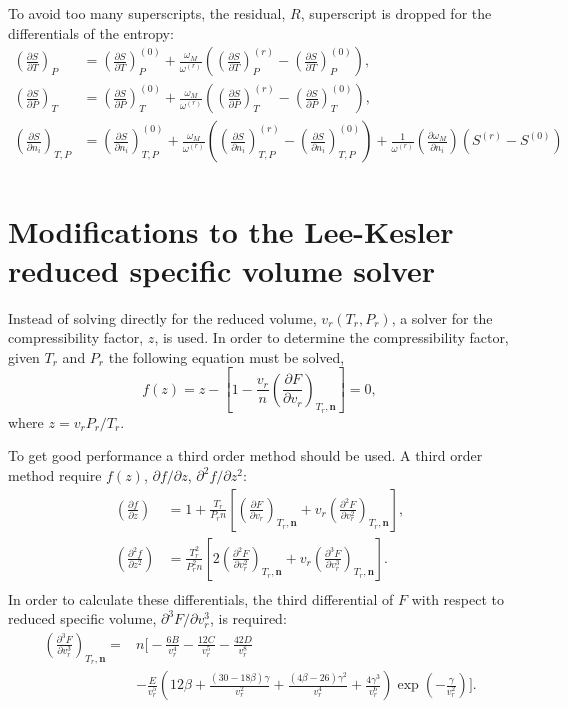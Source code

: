 \documentclass[internal,english]{sintefmemo2012}
\numberwithin{equation}{section}
\newcommand*{\pder}[2]{\left(\frac{\partial #1}{\partial #2}\right)}
\newcommand*{\pdder}[2]{\left(\frac{\partial^2 #1}{\partial
      #2^2}\right)}
\newcommand*{\pddder}[2]{\left(\frac{\partial^3 #1}{\partial #2^3}\right)}
\begin{document}
To avoid too many superscripts, the residual, $R$, superscript is
dropped for the differentials of the entropy:
\begin{align}
\label{eq:LK_entropy_diff}
\pder{S}{T}_{P} &= \pder{S}{T}_{P}^{(0)} +
\frac{\omega_M}{\omega^{(r)}}\left(\pder{S}{T}_{P}^{(r)} -
\pder{S}{T}_{P}^{(0)}\right), \\
\pder{S}{P}_{T} &= \pder{S}{P}_{T}^{(0)} +
\frac{\omega_M}{\omega^{(r)}}\left(\pder{S}{P}_{T}^{(r)} -
\pder{S}{P}_{T}^{(0)}\right), \\
\pder{S}{n_i}_{T,P} &= \pder{S}{n_i}_{T,P}^{(0)} +
\frac{\omega_M}{\omega^{(r)}}\left(\pder{S}{n_i}_{T,P}^{(r)} -
\pder{S}{n_i}_{T,P}^{(0)}\right) +
\frac{1}{\omega^{(r)}}\pder{\omega_M}{n_i}\left(S^{(r)} - S^{(0)}\right)\\
\end{align}

\section{Modifications to the Lee-Kesler reduced specific volume solver}
Instead of solving directly for the reduced volume, $v_r(T_r,P_r)$, a solver
for the compressibility factor, $z$, is used. In order to determine the
compressibility factor, given $T_r$ and $P_r$ the following equation
must be solved,
\begin{equation}
\label{eq:LK_z_fun}
f(z) = z - \left[1 - \frac{v_r}{n} \left( \frac{\partial F}{\partial v_r} \right)_{T_r, \textbf{n}} \right] = 0,
\end{equation}
where $z=v_rP_r/T_r$.

To get good performance a third order method should be used. A third
order method require $f(z)$, $\partial f/ \partial z$, $\partial^2
f / \partial z^2$:
\begin{align}
\label{eq:LK_z_fun_diff}
\pder{f}{z} &= 1 + \frac{T_r}{P_r n} \left[\pder{F}{v_r}_{T_r, \textbf{n}} + v_r\pdder{F}{v_r}_{T_r, \textbf{n}}\right],\\
\pdder{f}{z} &= \frac{T_r^2}{P_r^2 n} \left[2\pdder{F}{v_r}_{T_r,
    \textbf{n}} + v_r \pddder{F}{v_r}_{T_r, \textbf{n}}\right].\\
\end{align}
In order to calculate these differentials, the third differential of
$F$ with respect to reduced specific volume, $\partial^3
F/ \partial v_r^3$, is required:
\begin{align}
\label{eq:LK_FDiff3vr}
\pddder{F}{v_r}_{T_r, \textbf{n}} =& n \bigg[-\frac{6B}{v_r^4} - \frac{12C}{v_r^5} - \frac{42D}{v_r^8} \\
  & - \frac{E}{v_r^5} \left(12\beta + \frac{(30 - 18\beta)\gamma}{v_r^2} + \frac{\left(4\beta-26\right)\gamma^2}{v_r^4} + \frac{4\gamma^3}{v_r^6} \right) \exp \left(-\frac{\gamma}{v_r^2} \right)\bigg]. \\
\end{align}
\end{document}
